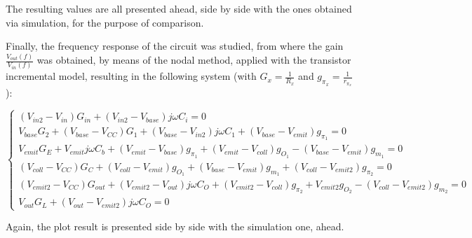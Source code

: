 \par The resulting values are all presented ahead, side by side with the ones obtained via simulation, for the purpose of comparison.

\par Finally, the frequency response of the circuit was studied, from where the gain $\frac{V_{out}(f)}{V_{in}(f)}$ was obtained, by means of the nodal method, applied with the transistor incremental model, resulting in the following system (with $G_x=\frac{1}{R_x}$ and $g_{\pi_x}=\frac{1}{r_{\pi_x}}$):

\begin{center}
  $\begin{cases} (V_{in2}-V_{in})G_{in}+(V_{in2}-V_{base})j \omega C_i=0  \\ V_{base}G_2 + (V_{base}-V_{CC})G_1 + (V_{base}-V_{in2})j \omega C_1 + (V_{base}-V_{emit})g_{\pi_1}=0 \\ V_{emit}G_E + V_{emit}j \omega C_b + (V_{emit}-V_{base})g_{\pi_1}+(V_{emit}-V_{coll})g_{O_1}-(V_{base}-V_{emit})g_{m_1}=0 \\ (V_{coll}-V_{CC})G_C + (V_{coll}-V_{emit})g_{O_1}+(V_{base}-V_{emit})g_{m_1}+(V_{coll}-V_{emit2})g_{\pi_2}=0 \\ (V_{emit2}-V_{CC})G_{out} + (V_{emit2}-V_{out})j \omega C_O + (V_{emit2}-V_{coll})g_{\pi_2} + V_{emit2}g_{O_2}-(V_{coll}-V_{emit2})g_{m_2} =0 \\ V_{out}G_L + (V_{out}-V_{emit2})j \omega C_O =0  \end{cases}$
\end{center}


\par Again, the plot result is presented side by side with the simulation one, ahead.
